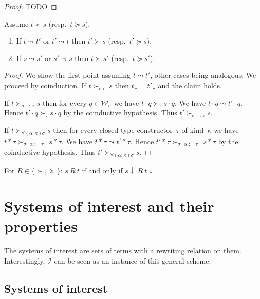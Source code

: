 \documentclass[runningheads,a4paper]{llncs}
\newcommand{\Iterms}{\mathcal{I}}
\newcommand{\World}{\mathcal{W}}
\newcommand{\arrtype}{\rightarrow}
\newcommand{\app}[2]{#1 \cdot #2}
\newcommand{\tapp}[2]{#1 * #2}
\newcommand{\subst}[2]{#1:=#2}
\newcommand{\nat}{\mathtt{nat}}
\newcommand{\da}{\mathord{\downarrow}}
\begin{document}
\begin{proof}
TODO
\end{proof}

\begin{lemma}
  Assume $t \succ s$ (resp.~$t \succeq s$).
  \begin{enumerate}
  \item If $t \leadsto t'$ or $t' \leadsto t$ then $t' \succ s$ (resp.~$t' \succeq s$).
  \item If $s \leadsto s'$ or $s' \leadsto s$ then $t \succ s'$
    (resp.~$t \succeq s'$).
  \end{enumerate}
\end{lemma}

\begin{proof}
  We show the first point assuming $t \leadsto t'$, other cases being
  analogous. We proceed by coinduction. If $t \succ_\nat s$ then
  $t\da = t'\da$ and the claim holds.

  If $t \succ_{\sigma\arrtype\tau} s$ then for every
  $q \in \World_\sigma$ we have $\app{t}{q} \succ_\tau \app{s}{q}$. We
  have $\app{t}{q} \leadsto \app{t'}{q}$. Hence
  $\app{t'}{q} \succ_\tau \app{s}{q}$ by the coinductive
  hypothesis. Thus $t' \succ_{\sigma\arrtype\tau} s$.

  If $t \succ_{\forall(\alpha:\kappa)\sigma} s$ then for every closed
  type constructor~$\tau$ of kind~$\kappa$ we have
  $\tapp{t}{\tau} \succ_{\sigma[\subst{\alpha}{\tau}]}
  \tapp{s}{\tau}$. We have $\tapp{t}{\tau} \leadsto
  \tapp{t'}{\tau}$. Hence
  $\tapp{t'}{\tau} \succ_{\sigma[\subst{\alpha}{\tau}]}
  \tapp{s}{\tau}$ by the coinductive hypothesis. Thus
  $t' \succ_{\forall(\alpha:\kappa)\sigma} s$.
\end{proof}

\begin{corollary}
  For $R \in \{\succ,\succeq\}$: $s\ R\ t$ if and only if
  $s\downarrow\ R\ t\downarrow$
\end{corollary}

\section{Systems of interest and their properties}\label{sec:systems}

The systems of interest are sets of terms with a rewriting relation on
them. Interestingly, $\Iterms$ can be seen as an instance of this
general scheme.

\subsection{Systems of interest}
\end{document}
